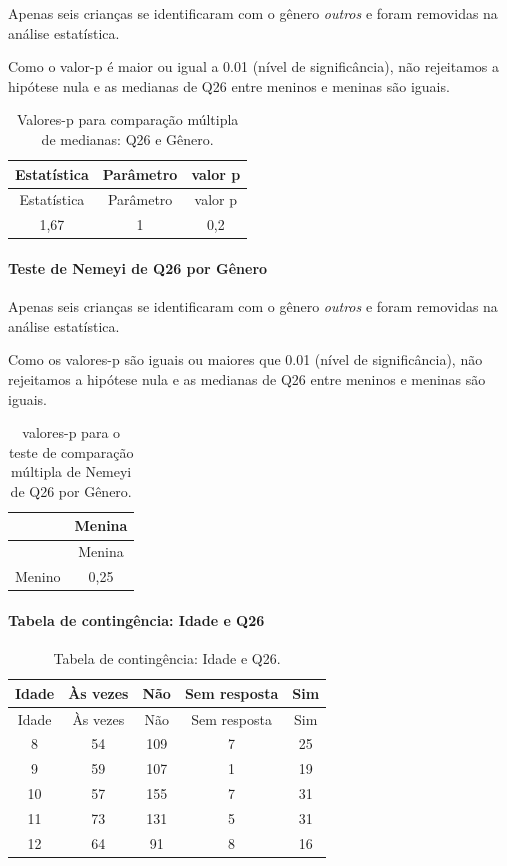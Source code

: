 \documentclass[]{article}
\let\oldparagraph\paragraph
\renewcommand{\paragraph}[1]{\oldparagraph{#1}\mbox{}}
\begin{document}
Apenas seis crianças se identificaram com o gênero \emph{outros} e foram removidas na análise estatística.

Como o valor-p é maior ou igual a 0.01 (nível de significância), não rejeitamos a hipótese nula e as medianas de Q26 entre meninos e meninas são iguais.

\begin{longtable}[]{@{}ccc@{}}
\caption{\label{tab:unnamed-chunk-737}Valores-p para comparação múltipla de medianas: Q26 e Gênero.}\tabularnewline
\toprule
Estatística & Parâmetro & valor p\tabularnewline
\midrule
\endfirsthead
\toprule
Estatística & Parâmetro & valor p\tabularnewline
\midrule
\endhead
1,67 & 1 & 0,2\tabularnewline
\bottomrule
\end{longtable}

\hypertarget{teste-de-nemeyi-de-q26-por-guxeanero}{%
\paragraph{Teste de Nemeyi de Q26 por Gênero}\label{teste-de-nemeyi-de-q26-por-guxeanero}}

Apenas seis crianças se identificaram com o gênero \emph{outros} e foram removidas na análise estatística.

Como os valores-p são iguais ou maiores que 0.01 (nível de significância), não rejeitamos a hipótese nula e as medianas de Q26 entre meninos e meninas são iguais.

\begin{longtable}[]{@{}lc@{}}
\caption{\label{tab:unnamed-chunk-739}valores-p para o teste de comparação múltipla de Nemeyi de Q26 por Gênero.}\tabularnewline
\toprule
& Menina\tabularnewline
\midrule
\endfirsthead
\toprule
& Menina\tabularnewline
\midrule
\endhead
Menino & 0,25\tabularnewline
\bottomrule
\end{longtable}

\cleardoublepage

\hypertarget{tabela-de-continguxeancia-idade-e-q26}{%
\paragraph{Tabela de contingência: Idade e Q26}\label{tabela-de-continguxeancia-idade-e-q26}}

\begin{longtable}[]{@{}ccccc@{}}
\caption{\label{tab:unnamed-chunk-740}Tabela de contingência: Idade e Q26.}\tabularnewline
\toprule
Idade & Às vezes & Não & Sem resposta & Sim\tabularnewline
\midrule
\endfirsthead
\toprule
Idade & Às vezes & Não & Sem resposta & Sim\tabularnewline
\midrule
\endhead
8 & 54 & 109 & 7 & 25\tabularnewline
9 & 59 & 107 & 1 & 19\tabularnewline
10 & 57 & 155 & 7 & 31\tabularnewline
11 & 73 & 131 & 5 & 31\tabularnewline
12 & 64 & 91 & 8 & 16\tabularnewline
\bottomrule
\end{longtable}
\end{document}
